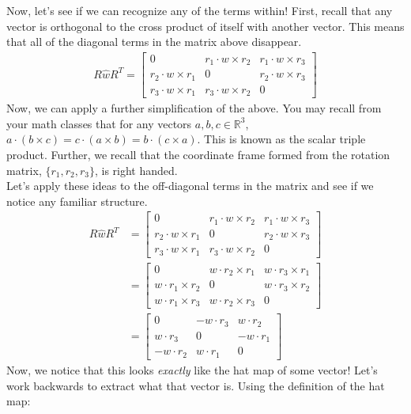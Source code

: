 \documentclass[oneside]{book}
\begin{document}
Now, let's see if we can recognize any of the terms within! First, recall that any vector is orthogonal to the cross product of itself with another vector. This means that all of the diagonal terms in the matrix above disappear.
\begin{align}
    R\hat{w}R^T = 
    \begin{bmatrix}
    0 & r_1\cdot w\times r_2 & r_1 \cdot w\times r_3\\
    r_2\cdot w \times r_1 & 0 & r_2 \cdot w\times r_3\\
    r_3\cdot w \times r_1 & r_3\cdot w\times r_2 & 0
    \end{bmatrix}
\end{align}
Now, we can apply a further simplification of the above. You may recall from your math classes that for any vectors $a, b, c\in \mathbb{R}^3$, $a\cdot(b\times c) = c\cdot (a\times b) = b\cdot (c\times a)$. This is known as the scalar triple product. Further, we recall that the coordinate frame formed from the rotation matrix, $\{r_1, r_2, r_3\}$, is right handed.\\
Let's apply these ideas to the off-diagonal terms in the matrix and see if we notice any familiar structure.
\begin{align}
    R\hat{w}R^T &= 
    \begin{bmatrix}
    0 & r_1\cdot w\times r_2 & r_1 \cdot w\times r_3\\
    r_2\cdot w \times r_1 & 0 & r_2 \cdot w\times r_3\\
    r_3\cdot w \times r_1 & r_3\cdot w\times r_2 & 0
    \end{bmatrix}\\
    &= 
    \begin{bmatrix}
    0 & w \cdot r_2 \times r_1 & w \cdot r_3\times r_1\\
    w \cdot r_1 \times r_2 & 0 & w \cdot r_3\times r_2\\
    w \cdot r_1\times r_3 & w \cdot r_2\times r_3 & 0
    \end{bmatrix}\\
    &= 
    \begin{bmatrix}
    0 & -w \cdot r_3 & w \cdot r_2\\
    w \cdot r_3 & 0 & -w \cdot r_1\\
    -w \cdot r_2 & w \cdot r_1 & 0
    \end{bmatrix}
\end{align}
Now, we notice that this looks \textit{exactly} like the hat map of some vector! Let's work backwards to extract what that vector is. Using the definition of the hat map:
\end{document}
